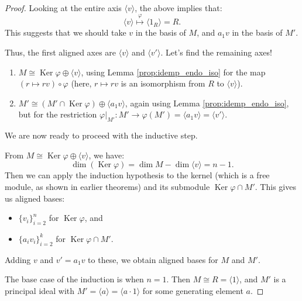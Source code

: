 \documentclass{article}
\newif\ifusemulticols
\newif\ifmobileview
\theoremstyle{definition}
\theoremstyle{remark}
\theoremstyle{plain}
\theoremstyle{plain}
\newenvironment{mymulticols}
    { \ifusemulticols \begin{multicols}{2} \fi }
    { \ifusemulticols \end{multicols} \fi }
\newcommand\mywrapbegin[3]{\ifmobileview\else\begin{wrapfigure}[#1]{#2}{#3}\fi}
\newcommand\mywrapend{\ifmobileview\else\end{wrapfigure}\fi}
\DeclareMathOperator{\Ker}{Ker}
\begin{document}
\begin{mymulticols}
\begin{proof}
    Looking at the entire axis $\langle v \rangle$, the above implies that:
    $$\langle v \rangle \stackrel{\varphi}{\mapsto} \langle 1_R \rangle = R.$$
    This suggests that we should take $v$ in the basis of $M$, and $a_1 v$ in the basis of $M'$.

    Thus, the first aligned axes are $\langle v \rangle$ and $\langle v' \rangle$.
    Let's find the remaining axes!


    \begin{enumerate}
        \item $M \cong \Ker \varphi \oplus \langle v \rangle$, using Lemma \ref{prop:idemp_endo_iso}
            for the map $(r \mapsto rv) \circ \varphi$ (here, $r \mapsto rv$ is an isomorphism from
            $R$ to $\langle v \rangle$).

        \item $M' \cong (M' \cap \Ker \varphi) \oplus \langle a_1 v \rangle$, again using Lemma
            \ref{prop:idemp_endo_iso}, but for the restriction $\varphi|_{M'} : M' \to \varphi(M') =
            \langle a_1 v \rangle = \langle v' \rangle$.
    \end{enumerate}


    We are now ready to proceed with the inductive step.

    From $M \cong \Ker \varphi \oplus \langle v \rangle$, we have:
    $$\dim(\Ker \varphi) = \dim M - \dim \langle v \rangle = n - 1.$$
    Then we can apply the induction hypothesis to the kernel (which is a free module, as shown in earlier theorems) and its submodule $\Ker \varphi \cap M'$. This gives us aligned bases:
    \begin{itemize}
        \item $\{v_i\}_{i=2}^n$ for $\Ker \varphi$, and
        \item $\{a_i v_i\}_{i=2}^k$ for $\Ker \varphi \cap M'$.
    \end{itemize}

    Adding $v$ and $v' = a_1 v$ to these, we obtain aligned bases for $M$ and $M'$.

    The base case of the induction is when $n = 1$. Then $M \cong R = \langle 1 \rangle$, and $M'$
    is a principal ideal with $M' = \langle a \rangle = \langle a \cdot 1 \rangle$ for some generating element $a$.
\end{proof}


\end{mymulticols}
\end{document}
